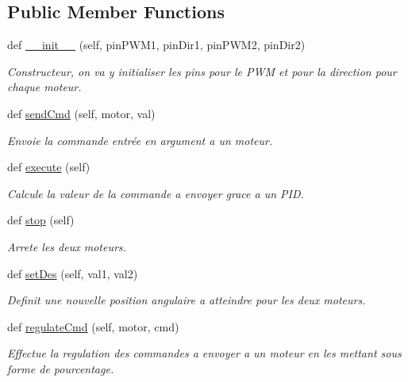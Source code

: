 \subsection*{Public Member Functions}
\begin{DoxyCompactItemize}
\item 
def \hyperlink{classcontroller_1_1Controller_a60886a7a74662e1d71da2e88555bb08b}{\+\_\+\+\_\+init\+\_\+\+\_\+} (self, pin\+P\+W\+M1, pin\+Dir1, pin\+P\+W\+M2, pin\+Dir2)
\begin{DoxyCompactList}\small\item\em Constructeur, on va y initialiser les pins pour le P\+WM et pour la direction pour chaque moteur. \end{DoxyCompactList}\item 
def \hyperlink{classcontroller_1_1Controller_a93cb1a5ccca3ca00f803da3558dee95d}{send\+Cmd} (self, motor, val)
\begin{DoxyCompactList}\small\item\em Envoie la commande entrée en argument a un moteur. \end{DoxyCompactList}\item 
def \hyperlink{classcontroller_1_1Controller_aea95f1e9b68ed4eb5447e3e4aed805fa}{execute} (self)\hypertarget{classcontroller_1_1Controller_aea95f1e9b68ed4eb5447e3e4aed805fa}{}\label{classcontroller_1_1Controller_aea95f1e9b68ed4eb5447e3e4aed805fa}

\begin{DoxyCompactList}\small\item\em Calcule la valeur de la commande a envoyer grace a un P\+ID. \end{DoxyCompactList}\item 
def \hyperlink{classcontroller_1_1Controller_a8ba4b15d12681e8f94bfa136d984f8a4}{stop} (self)\hypertarget{classcontroller_1_1Controller_a8ba4b15d12681e8f94bfa136d984f8a4}{}\label{classcontroller_1_1Controller_a8ba4b15d12681e8f94bfa136d984f8a4}

\begin{DoxyCompactList}\small\item\em Arrete les deux moteurs. \end{DoxyCompactList}\item 
def \hyperlink{classcontroller_1_1Controller_a49d765b2942b1631d4c2680f2864fd55}{set\+Des} (self, val1, val2)
\begin{DoxyCompactList}\small\item\em Definit une nouvelle position angulaire a atteindre pour les deux moteurs. \end{DoxyCompactList}\item 
def \hyperlink{classcontroller_1_1Controller_a6a29180c5d05fe547cd94cc9074af539}{regulate\+Cmd} (self, motor, cmd)
\begin{DoxyCompactList}\small\item\em Effectue la regulation des commandes a envoyer a un moteur en les mettant sous forme de pourcentage. \end{DoxyCompactList}\end{DoxyCompactItemize}
